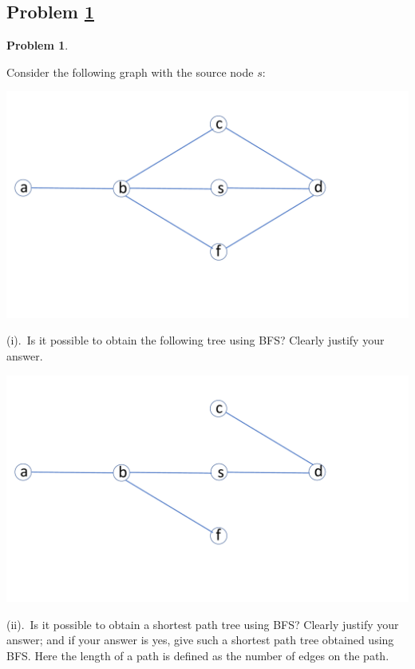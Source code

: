 \documentclass[11pt]{article}
\theoremstyle{definition}
\theoremstyle{definition}
\newtheorem{required}{Problem}
\theoremstyle{definition}
\begin{document}
\subsection{Problem \ref{dfs1}}
\begin{required} \label{dfs1}

Consider the following graph with the source node $s$:
	
\begin{center}
\noindent \includegraphics[scale=0.25]{BFS.pdf}
\end{center}


	(i).~Is it possible to obtain the following tree using BFS? Clearly justify your answer.
	
	
	\begin{center}
\noindent \includegraphics[scale=0.25]{tree.pdf}
\end{center}

 (ii).~Is it possible to obtain a shortest path tree using BFS? Clearly justify your answer; and if your answer is yes, give such a shortest path tree obtained using BFS. Here the length of a path is defined as the number of edges on the path. 
 
\end{required}
\end{document}
